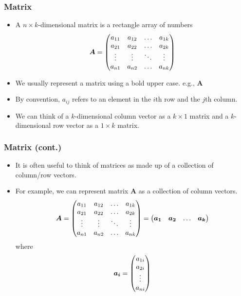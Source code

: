 \documentclass[pdflatex, 12pt]{beamer}
\begin{document}
\begin{frame}
\frametitle{Matrix}
\begin{itemize}
\item A $n \times k$-dimensional matrix is a rectangle array of numbers
 \begin{equation}
 \bm{A} = \begin{pmatrix}
 a_{11} & a_{12} & \ldots & a_{1k} \\
 a_{21} & a_{22} & \ldots & a_{2k} \\
 \vdots & \vdots & \ddots & \vdots \\
 a_{n1} & a_{n2} & \ldots & a_{nk} \\
 \end{pmatrix} \notag
 \end{equation}
\item We usually represent a matrix using a bold upper case. e.g., $\bm{A}$
\vspace{0.4cm}
\item By convention, $a_{ij}$ refers to an element in the $i$th row and the $j$th column.
\vspace{0.4cm}
\item We can think of a $k$-dimensional column vector as a $k \times 1$ matrix and a $k$-dimensional row vector as a $1 \times k$ matrix.
\end{itemize}
\end{frame}

\begin{frame}
\frametitle{Matrix (cont.)}
\begin{itemize}
\item It is often useful to think of matrices as made up of a collection of column/row vectors.
\vspace{0.4cm}
\item For example, we can represent matrix $\bm{A}$ as a collection of column vectors.
 \begin{equation}
 \bm{A} = \begin{pmatrix}
 a_{11} & a_{12} & \ldots & a_{1k} \\
 a_{21} & a_{22} & \ldots & a_{2k} \\
 \vdots & \vdots & \ddots & \vdots \\
 a_{n1} & a_{n2} & \ldots & a_{nk} \\
 \end{pmatrix} = \begin{pmatrix}
 \bm{a_1} & \bm{a_2} & \ldots & \bm{a_k} \\
 \end{pmatrix} \notag
 \end{equation}
 where
 \begin{equation}
 \bm{a_i} = \begin{pmatrix}
 a_{1i} \\
 a_{2i} \\
 \vdots \\
 a_{ni} \\
 \end{pmatrix} \notag
 \end{equation}
\end{itemize}
\end{frame}
\end{document}
